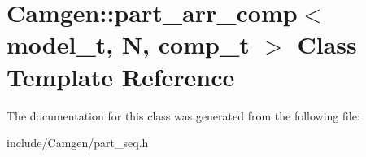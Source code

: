 \hypertarget{a00398}{}\section{Camgen\+:\+:part\+\_\+arr\+\_\+comp$<$ model\+\_\+t, N, comp\+\_\+t $>$ Class Template Reference}
\label{a00398}


The documentation for this class was generated from the following file\+:\begin{DoxyCompactItemize}
\item 
include/\+Camgen/part\+\_\+seq.\+h\end{DoxyCompactItemize}
